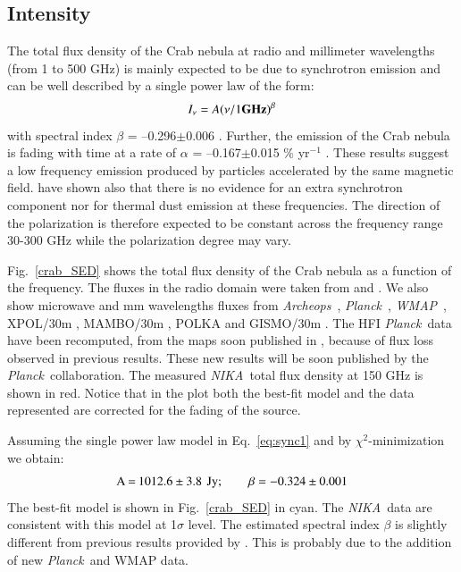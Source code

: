\documentclass[twocolumn,traditabstract]{aa}
\def\NIKA{\textit{NIKA}}
\def\Archeops{\textit{Archeops}}
\def\Planck{\textit{Planck}}
\def\WMAP{\textit{WMAP}}
\begin{document}
\subsection{Intensity}
The total flux density of the Crab nebula at radio and millimeter
wavelengths (from 1 to 500 GHz) is mainly expected to be due to synchrotron emission and can be
well described by a single power law of the form:
\begin{equation}
I_{\nu} = A(\nu / 1 {\bf GHz})^{\beta}
\label{eq:sync1}
\end{equation}
with spectral index $\beta$ = --0.296$\pm$0.006 \citep{baars1977absolute,macias2010}. Further, the emission of the Crab nebula is fading with time at a rate of $\alpha$ = --0.167$\pm$0.015 \% yr$^{-1}$ \citep{aller1985decrease}. 
These results suggest a low frequency emission produced by particles accelerated by the same magnetic field. \cite{macias2010} have shown also that there is no evidence for an extra synchrotron component nor for thermal dust emission at these frequencies. The direction of the polarization is therefore expected to be constant across the frequency range 30-300 GHz while the polarization degree may vary.

Fig.~\ref{crab_SED} shows the total flux density of the Crab nebula as a function of the frequency. The fluxes in the radio domain were taken from \cite{dmitrenko1970absolute} and \cite{1971IzVUZ..14..157V}. We also show microwave and mm wavelengths fluxes from \Archeops\ \citep{macias2007archeops}, \Planck\ \citep{2015arXiv150702058P}, \WMAP\ \citep{2011ApJS..192...19W}, XPOL/30m \citep{aumont2010}, MAMBO/30m \citep{2002A&A...386.1044B}, POLKA \citep{2014PASP..126.1027W} and GISMO/30m \citep{2011ApJ...734...54A}. The HFI \Planck\ data have been recomputed, from the maps soon published in \cite{planck2018}, because of flux loss observed in previous results. These new results will be soon published by the \Planck\ collaboration. The measured \NIKA\ total flux density at 150 GHz is shown in red. 
Notice that in the plot both the best-fit model and the data represented are corrected for the fading of the source.

Assuming the single power law model in Eq.~\ref{eq:sync1} and
by $\chi^2$-minimization we obtain:
$$\setlength\arraycolsep{0.1em}
 \begin{array}{rclcl}
  \textrm{A}&=& 1012.6\pm3.8 & & \textrm{Jy}; \quad \quad  \textrm{$\beta$} = - 0.324\pm0.001\\
 \end{array}
$$
The best-fit model is shown in Fig.~\ref{crab_SED} in cyan.
The \NIKA\ data are consistent with this model at 1$\sigma$ level.
The estimated spectral index $\beta$ is slightly different from previous results provided by \cite{macias2010}. This 
is probably due to the addition of new \Planck\ and  WMAP data.
\end{document}
